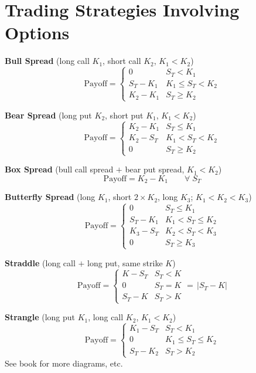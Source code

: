 
\section{Trading Strategies Involving Options}


\textbf{Bull Spread} {\footnotesize (long call $K_1$, short call $K_2$,\; $K_1<K_2$)}
\begin{equation*}
\text{Payoff} =
\begin{cases}
    0         & S_T < K_1 \\
    S_T - K_1 & K_1 \leq S_T < K_2 \\
    K_2 - K_1 & S_T \geq K_2
\end{cases}
\end{equation*}

\noindent\textbf{Bear Spread} {\footnotesize (long put $K_2$, short put $K_1$,\; $K_1<K_2$)}
\begin{equation*}
\text{Payoff} =
\begin{cases}
    K_2 - K_1 & S_T \leq K_1 \\
    K_2 - S_T & K_1 < S_T < K_2 \\
    0          & S_T \geq K_2
\end{cases}
\end{equation*}

\noindent\textbf{Box Spread} {\footnotesize (bull call spread $+$ bear put spread,\; $K_1<K_2$)}
\begin{equation*}
\text{Payoff} = K_2 - K_1 \qquad \forall\; S_T
\end{equation*}

\noindent\textbf{Butterfly Spread} {\footnotesize (long $K_1$, short $2\times K_2$, long $K_3$;\; $K_1<K_2<K_3$)}
\begin{equation*}
\text{Payoff} =
\begin{cases}
    0         & S_T \leq K_1 \\
    S_T - K_1 & K_1 < S_T \leq K_2 \\
    K_3 - S_T & K_2 < S_T < K_3 \\
    0         & S_T \geq K_3
\end{cases}
\end{equation*}

\noindent\textbf{Straddle} {\footnotesize (long call $+$ long put, same strike $K$)}
\begin{equation*}
\text{Payoff} =
\begin{cases}
    K - S_T & S_T < K \\
    0       & S_T = K \\
    S_T - K & S_T > K
\end{cases}
= \,|S_T - K|
\end{equation*}

\noindent\textbf{Strangle} {\footnotesize (long put $K_1$, long call $K_2$,\; $K_1<K_2$)}
\begin{equation*}
\text{Payoff} =
\begin{cases}
    K_1 - S_T & S_T < K_1 \\
    0          & K_1 \leq S_T \leq K_2 \\
    S_T - K_2 & S_T > K_2
\end{cases}
\end{equation*}
See book for more diagrams, etc.


